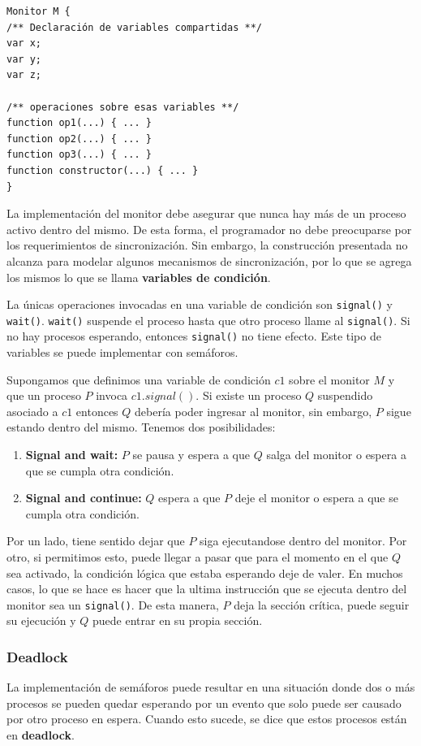 \begin{verbatim}
Monitor M {
/** Declaración de variables compartidas **/
var x;
var y;
var z;

/** operaciones sobre esas variables **/
function op1(...) { ... }
function op2(...) { ... }
function op3(...) { ... }
function constructor(...) { ... }
}
\end{verbatim}

La implementación del monitor debe asegurar que nunca hay más de un proceso activo dentro del mismo. De esta forma, el programador no debe preocuparse por los requerimientos de sincronización. Sin embargo, la construcción presentada no alcanza para modelar algunos mecanismos de sincronización, por lo que se agrega los mismos lo que se llama \textbf{variables de condición}.

La únicas operaciones invocadas en una variable de condición son \texttt{signal()} y \texttt{wait()}. \texttt{wait()} suspende el proceso hasta que otro proceso llame al \texttt{signal()}. Si no hay procesos esperando, entonces \texttt{signal()} no tiene efecto. Este tipo de variables se puede implementar con semáforos. 

Supongamos que definimos una variable de condición $c1$ sobre el monitor $M$ y que un proceso $P$ invoca $c1.signal()$. Si existe un proceso $Q$ suspendido asociado a $c1$ entonces $Q$ debería poder ingresar al monitor, sin embargo, $P$ sigue estando dentro del mismo. Tenemos dos posibilidades:

\begin{enumerate}
	\item \textbf{Signal and wait:} $P$ se pausa y espera a que $Q$ salga del monitor o espera a que se cumpla otra condición.
	\item \textbf{Signal and continue:} $Q$ espera a que $P$ deje el monitor o espera a que se cumpla otra condición.
\end{enumerate}

Por un lado, tiene sentido dejar que $P$ siga ejecutandose dentro del monitor. Por otro, si permitimos esto, puede llegar a pasar que para el momento en el que $Q$ sea activado, la condición lógica que estaba esperando deje de valer. En muchos casos, lo que se hace es hacer que la ultima instrucción que se ejecuta dentro del monitor sea un \texttt{signal()}. De esta manera, $P$ deja la sección crítica, puede seguir su ejecución y $Q$ puede entrar en su propia sección.

\subsubsection{Deadlock}
La implementación de semáforos puede resultar en una situación donde dos o más procesos se pueden quedar esperando por un evento que solo puede ser causado por otro proceso en espera.  Cuando esto sucede, se dice que estos procesos están en \textbf{deadlock}.

